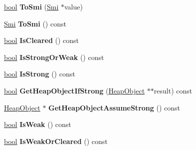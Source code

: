 \begin{DoxyCompactItemize}
\mbox{\hyperlink{classbool}{bool}} {\bfseries To\+Smi} (\mbox{\hyperlink{classv8_1_1internal_1_1Smi}{Smi}} $\ast$value)
\item 
\mbox{\label{classv8_1_1internal_1_1MaybeObject_af9552afba9877121ad24bb32b51add40}} 
\mbox{\hyperlink{classv8_1_1internal_1_1Smi}{Smi}} {\bfseries To\+Smi} () const
\item 
\mbox{\label{classv8_1_1internal_1_1MaybeObject_ae3f9618ed36b18ccfd283915a826c9f9}} 
\mbox{\hyperlink{classbool}{bool}} {\bfseries Is\+Cleared} () const
\item 
\mbox{\label{classv8_1_1internal_1_1MaybeObject_a96a61e361aa6e993a279302b80a29179}} 
\mbox{\hyperlink{classbool}{bool}} {\bfseries Is\+Strong\+Or\+Weak} () const
\item 
\mbox{\label{classv8_1_1internal_1_1MaybeObject_addc6852ba90b1e9dd5e1e946bf6c3813}} 
\mbox{\hyperlink{classbool}{bool}} {\bfseries Is\+Strong} () const
\item 
\mbox{\label{classv8_1_1internal_1_1MaybeObject_aae71902afa65a637d7d57cb1686920d6}} 
\mbox{\hyperlink{classbool}{bool}} {\bfseries Get\+Heap\+Object\+If\+Strong} (\mbox{\hyperlink{classv8_1_1internal_1_1HeapObject}{Heap\+Object}} $\ast$$\ast$result) const
\item 
\mbox{\label{classv8_1_1internal_1_1MaybeObject_a527403b54444cc003158114f2ae76031}} 
\mbox{\hyperlink{classv8_1_1internal_1_1HeapObject}{Heap\+Object}} $\ast$ {\bfseries Get\+Heap\+Object\+Assume\+Strong} () const
\item 
\mbox{\label{classv8_1_1internal_1_1MaybeObject_a5abaa8469b787aae67e50b342433b65a}} 
\mbox{\hyperlink{classbool}{bool}} {\bfseries Is\+Weak} () const
\item 
\mbox{\label{classv8_1_1internal_1_1MaybeObject_ad04169bb8afa669b4f39b6499670cc29}} 
\mbox{\hyperlink{classbool}{bool}} {\bfseries Is\+Weak\+Or\+Cleared} () const
\item 
$$
\end{DoxyCompactItemize}
